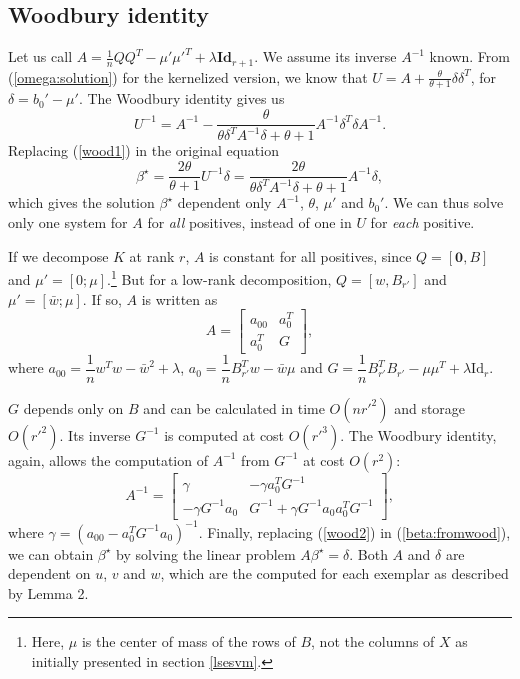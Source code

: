 \subsection{Woodbury identity}
Let us call $A=\frac{1}{n}QQ^T-\mu'\mu'^T+\lambda\textbf{Id}_{r+1}$. We assume its inverse $A^{-1}$ known. From (\ref{omega:solution}) for the kernelized version, we know that $U=A+\frac{\theta}{\theta+1}\delta\delta^T$, for $\delta=b_0'-\mu'$. The Woodbury identity gives us 
\begin{equation}
U^{-1}=A^{-1} -\dfrac{\theta}{\theta\delta^TA^{-1}\delta+ \theta+1}A^{-1}\delta^T\delta A^{-1}.\label{wood1}
\end{equation}
Replacing (\ref{wood1}) in the original equation 
\begin{equation}
\beta^\star = \dfrac{2\theta}{\theta+1}U^{-1}\delta = \dfrac{2\theta}{\theta\delta^TA^{-1}\delta+ \theta+1}A^{-1}\delta,\label{beta:fromwood}
\end{equation}
which gives the solution $\beta^\star$ dependent only $A^{-1}$, $\theta$, $\mu'$ and $b_0'$. 
We can thus solve only one system for $A$ for \textit{all} positives, instead of one in $U$ for \textit{each} positive.

If we decompose $K$ at rank $r$, $A$ is constant for all positives, since $Q = [\textbf{0}, B]$ and $\mu'=[0; \mu]$.\footnote{Here, $\mu$ is the center of mass of the rows of $B$, not the columns of $X$ as initially presented in section \ref{lsesvm}.} 
But for a low-rank decomposition, $Q=[w, B_{r'}]$ and $\mu' = [\bar{w}; \mu]$. If so, $A$ is written as 
\begin{equation}
A = \begin{bmatrix}
a_{00} & a_0^T\\
a_0^T & G
\end{bmatrix},
\end{equation}
where $a_{00}=\dfrac{1}{n}w^Tw-\bar{w}^2+\lambda$, $a_0 = \dfrac{1}{n}B_{r'}^Tw-\bar{w}\mu$ and $G=\dfrac{1}{n}B_{r'}^TB_{r'}-\mu\mu^T+\lambda\text{Id}_r$.

$G$ depends only on $B$ and can be calculated in time $O(nr'^2)$ and storage $O(r'^2)$. 
Its inverse $G^{-1}$ is computed at cost $O(r'^3)$.
The Woodbury identity, again, allows the computation of $A^{-1}$ from $G^{-1}$ at cost $O(r^2)$:
\begin{equation}
A^{-1} = \begin{bmatrix}\gamma & -\gamma a_0^TG^{-1}\\ -\gamma G^{-1}a_0 & G^{-1}+\gamma G^{-1}a_0a_0^TG^{-1}\end{bmatrix},\label{wood2}
\end{equation}
where $\gamma = \left(a_{00}-a_0^TG^{-1}a_0\right)^{-1}$. Finally, replacing (\ref{wood2}) in (\ref{beta:fromwood}), we can obtain $\beta^\star$ by solving the linear problem $A\beta^\star = \delta$. 
Both $A$ and $\delta$ are dependent on $u$, $v$ and $w$, which are the computed for each exemplar as described by Lemma 2.

